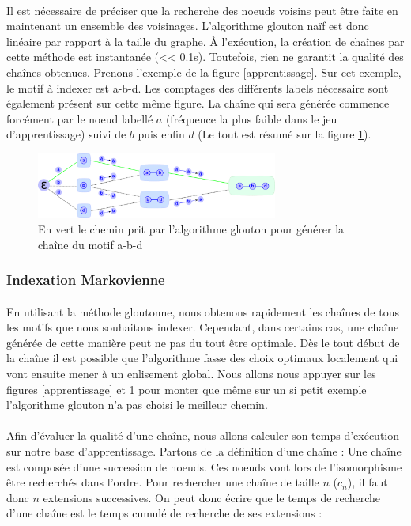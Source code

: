 \documentclass[12pt,french,twoside]{report}
\begin{document}
\paragraph{}Il est nécessaire de préciser que la recherche des noeuds voisins peut être faite en maintenant
un ensemble des voisinages. L'algorithme glouton naïf est donc linéaire par rapport à la taille du graphe. À l'exécution, la
création de chaînes par cette méthode est instantanée (<< 0.1s). Toutefois, rien ne garantit la qualité des chaînes obtenues.
Prenons l'exemple de la figure \ref{apprentissage}. Sur cet exemple, le motif à indexer est a-b-d. Les comptages des différents
labels nécessaire sont également présent sur cette même figure. La chaîne qui sera générée commence forcément par le noeud
labellé $a$ (fréquence la plus faible dans le jeu d'apprentissage) suivi de $b$ puis enfin $d$ (Le tout est résumé sur la figure
\ref{glouton}).

\begin{figure}
  \includegraphics[width=300px]{Figures/s2m/indexation/glouton.png}
  \caption{\label{glouton}En vert le chemin prit par l'algorithme glouton pour générer la chaîne du motif a-b-d}
\end{figure}

\subsubsection{Indexation Markovienne}

\paragraph{}En utilisant la méthode gloutonne, nous obtenons rapidement les chaînes de tous les motifs que nous
souhaitons indexer. Cependant, dans certains cas, une chaîne générée de cette manière peut ne pas du tout être optimale.
Dès le tout début de la chaîne il est possible que l'algorithme fasse des choix optimaux localement qui vont ensuite mener à un
enlisement global. Nous allons nous appuyer sur les figures \ref{apprentissage} et \ref{glouton} pour monter que même sur un si
petit exemple l'algorithme glouton n'a pas choisi le meilleur chemin.

\paragraph{}Afin d'évaluer la qualité d'une chaîne, nous allons calculer son temps d'exécution sur notre base d'apprentissage.
Partons de la définition d'une chaîne : Une chaîne est composée d'une succession de noeuds. Ces noeuds vont lors de l'isomorphisme
être recherchés dans l'ordre. Pour rechercher une chaîne de taille $n$ ($c_n$), il faut donc $n$ extensions successives. On
peut donc écrire que le temps de recherche d'une chaîne est le temps cumulé de recherche de ses extensions :
\end{document}
